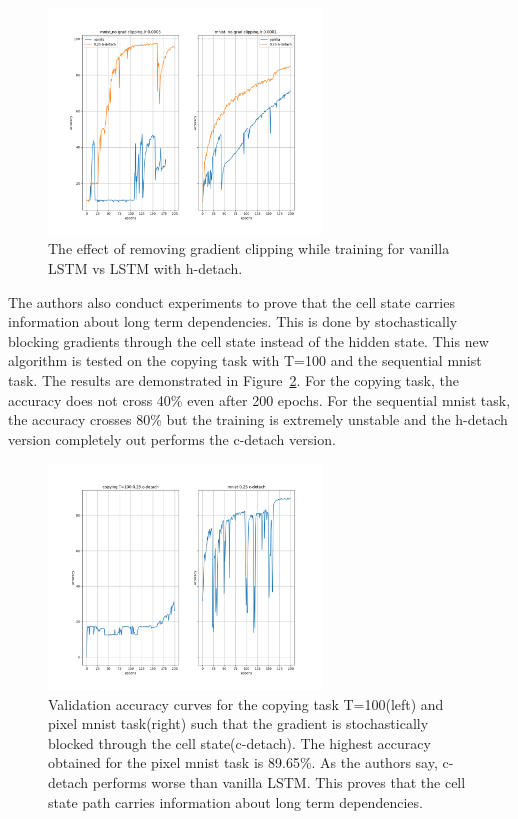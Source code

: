 \begin{figure}[ht]
\begin{center}
\includegraphics[width=\linewidth,height=6cm]{figures/gradclip22.png}
\end{center}
\caption{The effect of removing gradient clipping while training for vanilla LSTM vs LSTM with h-detach.}
\label{figure5}
\end{figure}

The authors also conduct experiments to prove that the cell state carries information about long term dependencies. This is done by stochastically blocking gradients through the cell state instead of the hidden state. This new algorithm is tested on the copying task with T=100 and the sequential mnist task. The results are demonstrated in Figure~\ref{figure6}. For the copying task, the accuracy does not cross 40\% even after 200 epochs. For the sequential mnist task, the accuracy crosses 80\% but the training is extremely unstable and the h-detach version completely out performs the c-detach version.


\begin{figure}[ht]
\begin{center}
 \includegraphics[width=\linewidth,height=6cm]{figures/c_detach.png}
\end{center}
\caption{Validation accuracy curves for the copying task T=100(left) and pixel mnist task(right) such that the gradient is stochastically blocked through the cell state(c-detach). The highest accuracy obtained for the pixel mnist task is 89.65\%. As the authors say, c-detach performs worse than vanilla LSTM. This proves that the cell state path carries information about long term dependencies. }
\label{figure6}
\end{figure}
